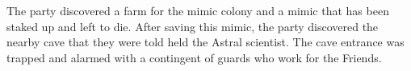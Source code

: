 The party discovered a farm for the mimic colony and a mimic that has been staked up and left to die.
After saving this mimic, the party discovered the nearby cave that they were told held the Astral scientist.
The cave entrance was trapped and alarmed with a contingent of guards who work for the Friends.
